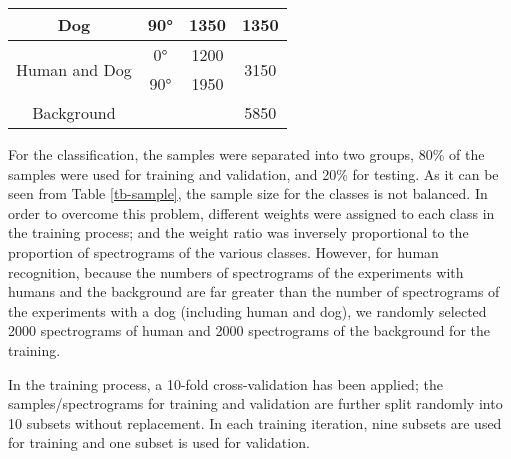 \begin{table}[]
\begin{tabular}{|c|c|c|c|c|}
Dog                            & 90°            & \multicolumn{2}{c|}{1350}           & 1350                   \\ \hline
\multirow{2}{*}{Human and Dog} & 0°             & \multicolumn{2}{c|}{1200}           & \multirow{2}{*}{3150}  \\ \cline{2-4}
                               & 90°            & \multicolumn{2}{c|}{1950}           &                        \\ \hline
Background                     & \multicolumn{3}{c|}{}                                & 5850                   \\ \hline
\end{tabular}
\end{table}


For the classification, the samples were separated into two groups, 80\% of the samples were used for training and validation, and 20\% for testing. As it can be seen from Table \ref{tb-sample}, the sample size for the classes is not balanced. In order to overcome this problem, different weights were assigned to each class in the training process; and the weight ratio was inversely proportional to the proportion of spectrograms of the various classes. However, for human recognition, because the numbers of spectrograms of the experiments with humans and the background are far greater than the number of spectrograms of the experiments with a dog (including human and dog), we randomly selected 2000 spectrograms of human and 2000 spectrograms of the background for the training.

In the training process, a 10-fold cross-validation has been applied; the samples/spectrograms for training and validation are further split randomly into 10 subsets without replacement. In each training iteration, nine subsets are used for training and one subset is used for validation.